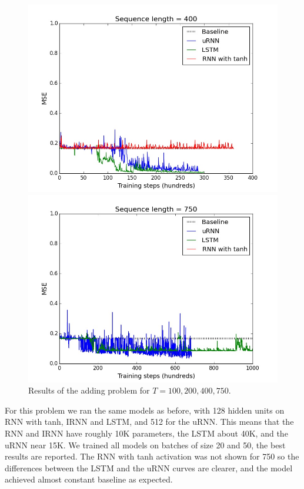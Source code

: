 \documentclass{article} %
\begin{document}
\begin{figure}[ht]
\begin{minipage}[b]{0.5\linewidth}
    \includegraphics[scale=0.25]{figures/adding_400.jpeg}
    \vspace{4ex}
    \end{minipage}%
  \begin{minipage}[b]{0.5\linewidth}
    \centering
    \includegraphics[scale=0.25]{figures/adding_750.jpeg}
    \vspace{4ex}
  \end{minipage} 
  \caption{Results of the adding problem for $T=100, 200, 400, 750$.}
\end{figure}

For this problem we ran the same models as before, with 128 hidden units on RNN with tanh, IRNN and LSTM, and 512 for the uRNN. This means that the RNN and IRNN have roughly 10K parameters, the LSTM about 40K, and the uRNN near 15K. We trained all models on batches of size 20 and 50, the best results are reported. The RNN with tanh activation was not shown for 750 so the differences between the LSTM and the uRNN curves are clearer, and the model achieved almost constant baseline as expected. 
\end{document}
